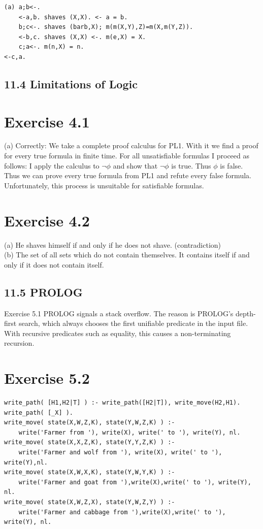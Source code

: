 \documentclass[10pt]{article}
\begin{document}
\begin{verbatim}
(a) a;b<-.
    <-a,b. shaves (X,X). <- a = b.
    b;c<-. shaves (barb,X); m(m(X,Y),Z)=m(X,m(Y,Z)).
    <-b,c. shaves (X,X) <-. m(e,X) = X.
    c;a<-. m(n,X) = n.
<-c,a.
\end{verbatim}

\subsection*{11.4 Limitations of Logic}
\section*{Exercise 4.1}
(a) Correctly: We take a complete proof calculus for PL1. With it we find a proof for every true formula in finite time. For all unsatisfiable formulas I proceed as follows: I apply the calculus to $\neg \phi$ and show that $\neg \phi$ is true. Thus $\phi$ is false. Thus we can prove every true formula from PL1 and refute every false formula. Unfortunately, this process is unsuitable for satisfiable formulas.

\section*{Exercise 4.2}
(a) He shaves himself if and only if he does not shave. (contradiction)\\
(b) The set of all sets which do not contain themselves. It contains itself if and only if it does not contain itself.

\subsection*{11.5 PROLOG}
Exercise 5.1 PROLOG signals a stack overflow. The reason is PROLOG's depth-first search, which always chooses the first unifiable predicate in the input file. With recursive predicates such as equality, this causes a non-terminating recursion.

\section*{Exercise 5.2}
\begin{verbatim}
write_path( [H1,H2|T] ) :- write_path([H2|T]), write_move(H2,H1).
write_path( [_X] ).
write_move( state(X,W,Z,K), state(Y,W,Z,K) ) :-
    write('Farmer from '), write(X), write(' to '), write(Y), nl.
write_move( state(X,X,Z,K), state(Y,Y,Z,K) ) :-
    write('Farmer and wolf from '), write(X), write(' to '), write(Y),nl.
write_move( state(X,W,X,K), state(Y,W,Y,K) ) :-
    write('Farmer and goat from '),write(X),write(' to '), write(Y), nl.
write_move( state(X,W,Z,X), state(Y,W,Z,Y) ) :-
    write('Farmer and cabbage from '),write(X),write(' to '), write(Y), nl.
\end{verbatim}
\end{document}
